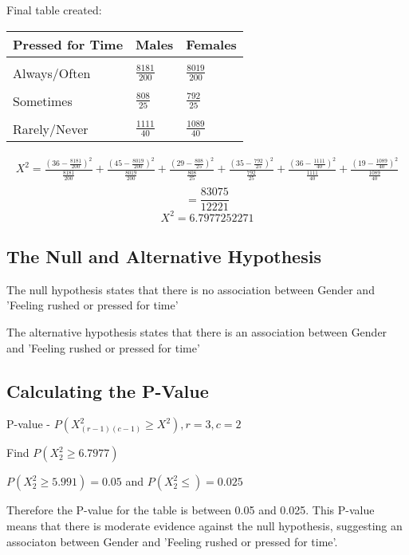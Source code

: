\documentclass[oneside, a4paper]{article}
\begin{document}
\begin{center}
    Final table created:
    \begin{table}[H]
        \centering
        \begin{tabular}{|l|l|l|}
        \hline
        \textbf{Pressed for Time} & \textbf{Males} & \textbf{Females} \\ \hline
        \\[-1em]
        Always/Often              & $\frac{8181}{200}$              & $\frac{8019}{200}$               \\ \hline
        \\[-1em]
        Sometimes                 & $\frac{808}{25}$             & $\frac{792}{25}$               \\ \hline
        \\[-1em]
        Rarely/Never              & $\frac{1111}{40}$             & $\frac{1089}{40}$               \\ \hline
        \end{tabular}
    \end{table}
\end{center}

\begin{equation*}
    \begin{split}
        X^2 = \frac{(36-\frac{8181}{200})^2}{\frac{8181}{200}} + \frac{(45-\frac{8019}{200})^2}{\frac{8019}{200}} + \frac{(29-\frac{808}{25})^2}{\frac{808}{25}} + \frac{(35-\frac{792}{25})^2}{\frac{792}{25}} + \frac{(36-\frac{1111}{40})^2}{\frac{1111}{40}} + \frac{(19-\frac{1089}{40})^2}{\frac{1089}{40}} \\
    \end{split}
\end{equation*}
$$ = \frac{83075}{12221}$$
$$ X^2 = 6.7977252271$$

\subsection{The Null and Alternative Hypothesis}

The null hypothesis states that there is no association between Gender and 'Feeling rushed or pressed for time'

The alternative hypothesis states that there is an association between Gender and 'Feeling rushed or pressed for time'

\subsection{Calculating the P-Value}

P-value - $P(X^2_{(r-1)(c-1)} \geq X^2), r = 3, c = 2$

Find $P(X^2_{2} \geq 6.7977)$

$P(X^2_2 \geq 5.991) = 0.05$ and $P(X^2_2 \leq ) = 0.025$

Therefore the P-value for the table is between 0.05 and 0.025. This P-value means that there is moderate evidence against the null hypothesis, suggesting an associaton between Gender and 'Feeling rushed or pressed for time'.
\end{document}
